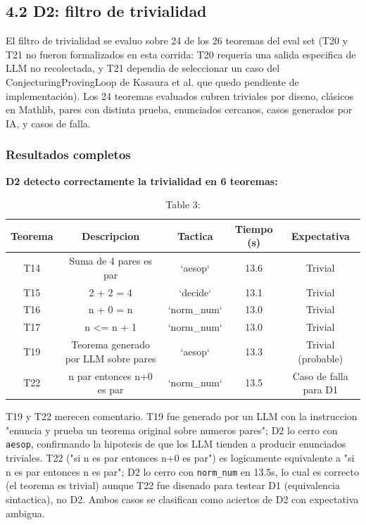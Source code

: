 \documentclass[12pt,a4paper]{article}
\theoremstyle{remark}
\begin{document}
\subsection{4.2 D2: filtro de trivialidad}

El filtro de trivialidad se evaluo sobre 24 de los 26 teoremas del eval set (T20 y T21 no fueron formalizados en esta corrida: T20 requeria una salida especifica de LLM no recolectada, y T21 dependia de seleccionar un caso del ConjecturingProvingLoop de Kasaura et al. que quedo pendiente de implementación). Los 24 teoremas evaluados cubren triviales por diseno, clásicos en Mathlib, pares con distinta prueba, enunciados cercanos, casos generados por IA, y casos de falla.


\subsubsection{Resultados completos}

\textbf{D2 detecto correctamente la trivialidad en 6 teoremas:}

\begin{table}[htbp]
\centering
\begin{tabular}{|c|c|c|c|c|}
\hline
Teorema & Descripcion & Tactica & Tiempo (s) & Expectativa \\
\hline
T14 & Suma de 4 pares es par & `aesop` & 13.6 & Trivial \\
T15 & 2 + 2 = 4 & `decide` & 13.1 & Trivial \\
T16 & n + 0 = n & `norm\_num` & 13.0 & Trivial \\
T17 & n <= n + 1 & `norm\_num` & 13.0 & Trivial \\
T19 & Teorema generado por LLM sobre pares & `aesop` & 13.3 & Trivial (probable) \\
T22 & n par entonces n+0 es par & `norm\_num` & 13.5 & Caso de falla para D1 \\
\hline
\end{tabular}
\caption{Table 3: }
\label{tab:3}
\end{table}


T19 y T22 merecen comentario. T19 fue generado por un LLM con la instruccion "enuncia y prueba un teorema original sobre numeros pares"; D2 lo cerro con \texttt{aesop}, confirmando la hipotesis de que los LLM tienden a producir enunciados triviales. T22 ("si n es par entonces n+0 es par") es logicamente equivalente a "si n es par entonces n es par"; D2 lo cerro con \texttt{norm\_num} en 13.5s, lo cual es correcto (el teorema es trivial) aunque T22 fue disenado para testear D1 (equivalencia sintactica), no D2. Ambos casos se clasifican como aciertos de D2 con expectativa ambigua.
\end{document}
